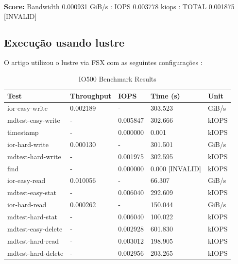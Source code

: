 \documentclass[article,a4paper,12pt,brazil,sumario=tradicional]{abntex2}
\begin{document}
\textbf{Score:} Bandwidth 0.000931 GiB/s : IOPS 0.003778 kiops : TOTAL 0.001875 [INVALID]
\subsection{Execução usando lustre}
O artigo utilizou o lustre via FSX com as seguintes configurações : 
\begin{table}[htb]
	\centering
	\begin{tabular}{|l|l|l|l|l|}
		\hline
		\rowcolor[HTML]{EFEFEF}
		\textbf{Test}          & \textbf{Throughput}        & \textbf{IOPS}         & \textbf{Time (s)} & \textbf{Unit} \\ \hline
		ior-easy-write         & 0.002189                    & -                    & 303.523           & GiB/s         \\ \hline
		mdtest-easy-write      & -                          & 0.005847             & 302.666           & kIOPS         \\ \hline
		timestamp              & -                          & 0.000000             & 0.001             & kIOPS         \\ \hline
		ior-hard-write         & 0.000130                    & -                    & 301.501           & GiB/s         \\ \hline
		mdtest-hard-write      & -                          & 0.001975             & 302.595           & kIOPS         \\ \hline
		find                   & -                          & 0.000000             & 0.000 [INVALID]   & kIOPS         \\ \hline
		ior-easy-read          & 0.010056                    & -                    & 66.307            & GiB/s         \\ \hline
		mdtest-easy-stat       & -                          & 0.006040             & 292.609           & kIOPS         \\ \hline
		ior-hard-read          & 0.000262                    & -                    & 150.044           & GiB/s         \\ \hline
		mdtest-hard-stat       & -                          & 0.006040             & 100.022           & kIOPS         \\ \hline
		mdtest-easy-delete     & -                          & 0.002928             & 601.830           & kIOPS         \\ \hline
		mdtest-hard-read       & -                          & 0.003012             & 198.905           & kIOPS         \\ \hline
		mdtest-hard-delete     & -                          & 0.002956             & 203.265           & kIOPS         \\ \hline
	\end{tabular}
	\caption{IO500 Benchmark Results}
	\label{tab:io500-results}
\end{table}
\end{document}

